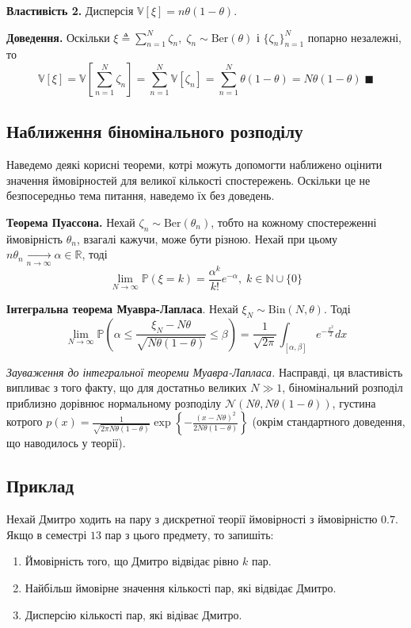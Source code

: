 \documentclass[14pt]{extarticle}
\begin{document}
\textbf{Властивість 2.} Дисперсія $\mathbb{V}[\xi] = n\theta(1-\theta)$.

\textbf{Доведення.} Оскільки $\xi\triangleq\sum_{n=1}^N \zeta_n, \; \zeta_n \sim \text{Ber}(\theta)$ і $\{\zeta_n\}_{n=1}^N$ попарно незалежні, то
\[
\mathbb{V}[\xi] = \mathbb{V}\left[\sum_{n=1}^N \zeta_n\right] = \sum_{n=1}^N \mathbb{V}[\zeta_n] = \sum_{n=1}^N \theta(1-\theta) = N\theta(1-\theta) \; \blacksquare
\]

\subsection*{Наближення біномінального розподілу}

Наведемо деякі корисні теореми, котрі можуть допомогти наближено оцінити значення ймовірностей для великої кількості спостережень. Оскільки це не безпосередньо тема питання, наведемо їх без доведень.

\textbf{Теорема Пуассона.} Нехай $\zeta_n \sim \text{Ber}(\theta_n)$, тобто на кожному спостереженні ймовірність $\theta_n$, взагалі кажучи, може бути різною. Нехай при цьому $n\theta_n \xrightarrow[n \to \infty]{} \alpha \in \mathbb{R}$, тоді
\[
\lim_{N \to \infty} \mathbb{P}(\xi=k) = \frac{\alpha^k}{k!}e^{-\alpha}, \; k \in \mathbb{N} \cup \{0\}
\]

\textbf{Інтегральна теорема Муавра-Лапласа}. Нехай $\xi_N \sim \text{Bin}(N,\theta)$. Тоді
\[
\lim_{N \to \infty} \mathbb{P}\left(\alpha \leq \frac{\xi_N-N\theta}{\sqrt{N\theta(1-\theta)}} \leq \beta\right) = \frac{1}{\sqrt{2\pi}}\int_{[\alpha,\beta]}e^{-\frac{x^2}{2}}dx
\]

\textit{Зауваження до інтегральної теореми Муавра-Лапласа.} Насправді, ця властивість випливає з того факту, що для достатньо великих $N \gg 1$, біномінальний розподіл приблизно дорівнює нормальному розподілу $\mathcal{N}(N\theta,N\theta(1-\theta))$, густина котрого $p(x)=\frac{1}{\sqrt{2\pi N\theta(1-\theta)}}\exp\left\{-\frac{(x-N\theta)^2}{2N\theta(1-\theta)}\right\}$ (окрім стандартного доведення, що наводилось у теорії). 

\subsection*{Приклад}

Нехай Дмитро ходить на пару з дискретної теорії ймовірності з ймовірністю $0.7$. Якщо в семестрі $13$ пар з цього предмету, то запишіть:
\begin{enumerate}
    \item Ймовірність того, що Дмитро відвідає рівно $k$ пар.
    \item Найбільш ймовірне значення кількості пар, які відвідає Дмитро.
    \item Дисперсію кількості пар, які відіває Дмитро.
\end{enumerate}
\end{document}
